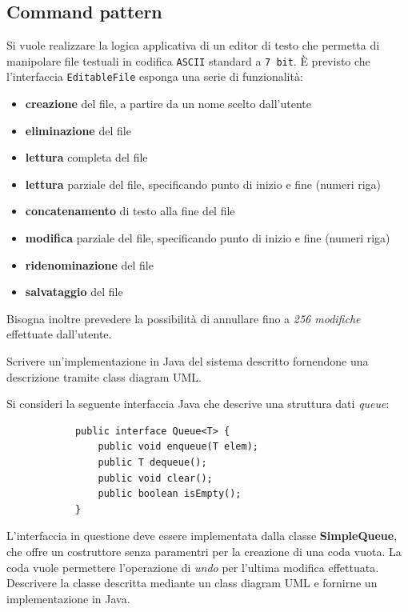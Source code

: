 \documentclass[12pt,a4paper]{article}
\begin{document}
    \subsection{Command pattern}\label{patter:command}
    \begin{Exercise}\label{command:ex1}
        Si vuole realizzare la logica applicativa di un editor di testo che permetta di manipolare file testuali in codifica \texttt{ASCII} standard a \texttt{7 bit}. È previsto che l'interfaccia \texttt{EditableFile} esponga una serie di funzionalità:
        \begin{itemize}
            \item \textbf{creazione} del file, a partire da un nome scelto dall'utente
            \item \textbf{eliminazione} del file
            \item \textbf{lettura} completa del file
            \item \textbf{lettura} parziale del file, specificando punto di inizio e fine (numeri riga)
            \item \textbf{concatenamento} di testo alla fine del file
            \item \textbf{modifica} parziale del file, specificando punto di inizio e fine (numeri riga)
            \item \textbf{ridenominazione} del file
            \item \textbf{salvataggio} del file
        \end{itemize}
        Bisogna inoltre prevedere la possibilità di annullare fino a \textit{256 modifiche} effettuate dall'utente.

        Scrivere un'implementazione in Java del sistema descritto fornendone una descrizione tramite class diagram UML.
    \end{Exercise}
    \begin{Exercise}
        Si consideri la seguente interfaccia Java che descrive una struttura dati \textit{queue}:
        \begin{lstlisting}
            public interface Queue<T> {
                public void enqueue(T elem);
                public T dequeue();
                public void clear();
                public boolean isEmpty();
            }
        \end{lstlisting}
        L'interfaccia in questione deve essere implementata dalla classe \textbf{SimpleQueue}, che offre un costruttore senza paramentri per la creazione di una coda vuota. La coda vuole permettere l'operazione di \textit{undo} per l'ultima modifica effettuata.
        Descrivere la classe descritta mediante un class diagram UML e fornirne un implementazione in Java. 
    \end{Exercise}
\end{document}
